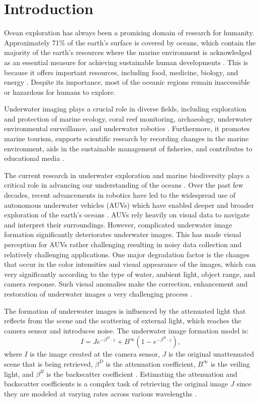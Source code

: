 \documentclass[3p,12pt,authoryear]{elsarticle}
\begin{document}
\section{Introduction}
\label{sec:intro}

Ocean exploration has always been a promising domain of research for humanity. Approximately 71\% of the earth's surface is covered by oceans, which contain the majority of the earth's resources where the marine environment is acknowledged as an essential measure for achieving sustainable human developments \cite{a5}. This is because it offers important resources, including food, medicine, biology, and energy \cite{national1995understanding}. Despite its importance, most of the oceanic regions remain inaccessible or hazardous for humans to explore.

Underwater imaging plays a crucial role in diverse fields, including exploration and protection of marine ecology, coral reef monitoring, archaeology, underwater environmental surveillance, and underwater robotics \cite{a7, a8, a9, Raveendran2021UnderwaterIE}. Furthermore, it promotes marine tourism, supports scientific research by recording changes in the marine environment, aids in the sustainable management of fisheries, and contributes to educational media \cite{naveen2024advancements}.

The current research in underwater exploration and marine biodiversity plays a critical role in advancing our understanding of the oceans \cite{a6}. Over the past few decades, recent advancements in robotics have led to the widespread use of autonomous underwater vehicles (AUVs) which have enabled deeper and broader exploration of the earth's oceans \cite{jmse10020241}. AUVs rely heavily on visual data to navigate and interpret their surroundings. However, complicated underwater image formation significantly deteriorates underwater images. This has made visual perception for AUVs rather challenging resulting in noisy data collection and relatively challenging applications. One major degradation factor is the changes that occur in the color intensities and visual appearance of the images, which can very significantly according to the type of water, ambient light, object range, and camera response. Such visual anomalies make the correction, enhancement and restoration of underwater images a very challenging process \cite{8578801}.

The formation of underwater images is influenced by the attenuated light that reflects from the scene and the scattering of external light, which reaches the camera sensor and introduces noise. The underwater image formation model is:
\begin{equation}
I = J e^{-\beta^D \cdot z} + B^\infty (1 - e^{-\beta^B \cdot z}),
\end{equation}
where $I$ is the image created at the camera sensor, $J$ is the original unattenuated scene that is being retrieved, $\beta^D$ is the attenuation coefficient, $B^\infty$ is the veiling light, and $\beta^B$ is the backscatter coefficient \cite{8954437}. Estimating the attenuation and backscatter coefficients is a complex task of retrieving the original image $J$ since they are modeled at varying rates across various wavelengths \cite{alma991029871581906387}. 
\end{document}
